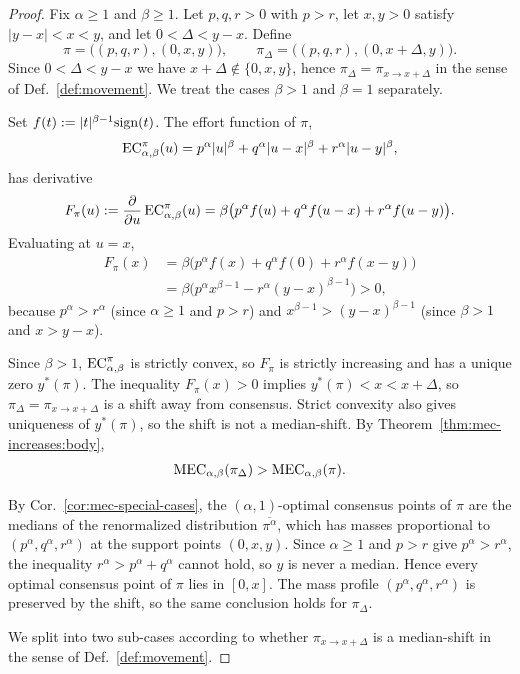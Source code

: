 \mecAxiomTwo*
\begin{proof}
Fix $\alpha\ge 1$ and $\beta\ge 1$. Let $p,q,r>0$ with $p>r$, let $x,y>0$ satisfy $|y-x|<x<y$, and let $0<\Delta<y-x$. Define
\[
\pi=\big((p,q,r),(0,x,y)\big),\qquad
\pi_\Delta=\big((p,q,r),(0,x+\Delta,y)\big).
\]
Since $0<\Delta<y-x$ we have $x+\Delta\notin\{0,x,y\}$, hence $\pi_\Delta=\pi_{x\to x+\Delta}$ in the sense of Def.~\ref{def:movement}. We treat the cases $\beta>1$ and $\beta=1$ separately.

Set $f(t):=|t|^{\beta-1}{\textrm{sign}}(t)$. The effort function of $\pi$,
\[
\EC[\alpha,\beta][\pi](u)
= p^\alpha|u|^\beta+q^\alpha|u-x|^\beta+r^\alpha|u-y|^\beta,
\]
has derivative
\[
F_\pi(u):=\frac{\partial}{\partial u}\EC[\alpha,\beta][\pi](u)
=\beta\big(p^\alpha f(u)+q^\alpha f(u-x)+r^\alpha f(u-y)\big).
\]
Evaluating at $u=x$,
\begin{align*}
F_\pi(x)
&=\beta\big(p^\alpha f(x)+q^\alpha f(0)+r^\alpha f(x-y)\big) \\
&=\beta\big(p^\alpha x^{\beta-1}-r^\alpha (y-x)^{\beta-1}\big)>0,
\end{align*}
because $p^\alpha>r^\alpha$ (since $\alpha\ge1$ and $p>r$) and
$x^{\beta-1}>(y-x)^{\beta-1}$ (since $\beta>1$ and $x>y-x$).

Since $\beta>1$, $\EC[\alpha,\beta][\pi]$ is strictly convex, so $F_\pi$ is strictly increasing and has a unique zero $y^*(\pi)$. The inequality $F_\pi(x)>0$ implies $y^*(\pi)<x<x+\Delta$, so $\pi_\Delta=\pi_{x\to x+\Delta}$ is a shift away from consensus. Strict convexity also gives uniqueness of $y^*(\pi)$, so the shift is not a median-shift. By Theorem~\ref{thm:mec-increases:body},
\[
\MEC(\pi_\Delta)>\MEC(\pi).
\]

By Cor.~\ref{cor:mec-special-cases}, the $(\alpha,1)$-optimal consensus points of $\pi$ are the medians of the renormalized distribution $\overline{\pi^\alpha}$, which has masses proportional to $(p^\alpha,q^\alpha,r^\alpha)$ at the support points $(0,x,y)$. Since $\alpha\ge 1$ and $p>r$ give $p^\alpha>r^\alpha$, the inequality $r^\alpha>p^\alpha+q^\alpha$ cannot hold, so $y$ is never a median. Hence every optimal consensus point of $\pi$ lies in $[0,x]$. The mass profile $(p^\alpha,q^\alpha,r^\alpha)$ is preserved by the shift, so the same conclusion holds for $\pi_\Delta$.

We split into two sub-cases according to whether $\pi_{x\to x+\Delta}$ is a median-shift in the sense of Def.~\ref{def:movement}.


\end{proof}
